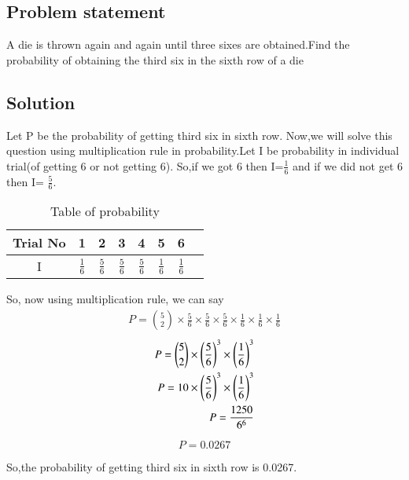 \documentclass[journal,12pt,twocolumn]{IEEEtran}
\begin{document}
 \begin{center}
     \section{\textbf{Problem statement}}
 \end{center}
A die is thrown again and again until three sixes are obtained.Find the probability of obtaining the third six in the sixth row of a die

\begin{center}
    \section{\textbf{Solution}}
\end{center}
 Let P be the probability of getting third six in sixth row.
 \newline
 Now,we will solve this question using multiplication rule in probability.Let I be probability in individual trial(of getting 6 or not getting 6). So,if we got 6 then I=$\frac{1}{6}$ and if we did not get 6 then I=
 $\frac{5}{6}$.
\begin{table}[ht]
\centering
\begin{tabular}{|c|c|c|c|c|c|c|c} \hline
    Trial No & 1 & 2 & 3 & 4 & 5 & 6 \\ \hline
    I & $\frac{1}{6}$ &$\frac{5}{6}$ &$\frac{5}{6}$&$\frac{5}{6}$&$\frac{1}{6}$&
   $\frac{1}{6}$ \\ \hline
    \end{tabular}
    \caption{ Table of probability }
    \label{table:1}
\end{table}

So, now using multiplication rule, we can say 
\begin{multline}
    P= {5 \choose 2}  \times \frac{5}{6} \times \frac{5}{6} \times \frac{5}{6}
       \times \frac{1}{6} \times \frac{1}{6} \times \frac{1}{6}
\end{multline}
\begin{align}
    P={5 \choose 2} \times \left(\frac{5}{6}\right)^3 \times \left(\frac{1}{6}\right)^3 \\
    P= 10 \times \left(\frac{5}{6}\right)^3 \times \left(\frac{1}{6}\right)^3 \\
    P= \frac{1250}{6^6}
\end{align}

\begin{equation}
    \boxed{P=0.0267}
\end{equation}
   
So,the probability of getting third six in sixth row is 0.0267.
\end{document}
